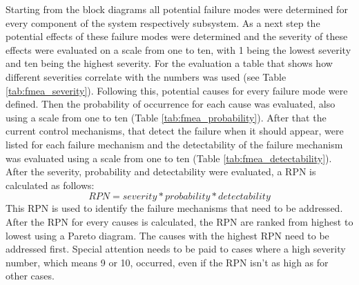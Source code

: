 \documentclass[ExampleMasters.tex]{subfiles}
\begin{document}
Starting from the block diagrams all potential failure modes were determined for every component of the system respectively subsystem. As a next step the potential effects of these failure modes were determined and the severity of these effects were evaluated on a scale from one to ten,  with 1 being the lowest severity and ten being the highest severity. For the evaluation a table that shows how different severities correlate with the numbers was used (see Table \ref{tab:fmea_severity}). 
Following this, potential causes for every failure mode were defined. Then the probability of occurrence for each cause was evaluated, also using a scale from one to ten (Table \ref{tab:fmea_probability}).
After that the current control mechanisms, that detect the failure when it should appear, were listed for each failure mechanism and the detectability of the failure mechanism was evaluated using a scale from one to ten (Table \ref{tab:fmea_detectability}).
After the severity, probability and detectability were evaluated, a \gls{RPN} is calculated as follows: 
\begin{equation*}
RPN=severity*probability*detectability
\end{equation*}      
This \gls{RPN} is used to identify the failure mechanisms that need to be addressed. After the \gls{RPN} for every causes is calculated, the \gls{RPN} are ranked from highest to lowest using a Pareto diagram. The causes with the highest \gls{RPN} need to be addressed first. Special attention needs to be paid to cases where a high severity number, which means 9 or 10, occurred, even if the \gls{RPN} isn't as high as for other cases. 
		
\end{document}
